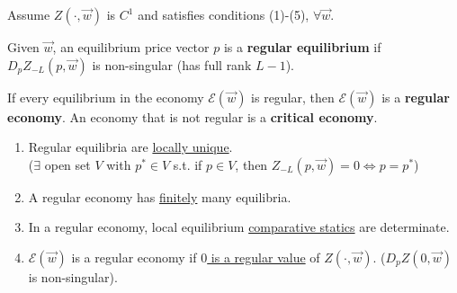 \documentclass[11pt]{elegantbook}
\begin{document}
Assume $Z(\cdot,\vec{w})$ is $C^1$ and satisfies conditions (1)-(5), $ \forall \vec{w}$.

\begin{definition}
    \normalfont
    Given $\vec{w}$, an equilibrium price vector $p$ is a \textbf{regular equilibrium} if $D_p Z_{-L}(p,\vec{w})$ is non-singular (has full rank $L-1$).
\end{definition}

\begin{definition}
    \normalfont
    If every equilibrium in the economy $\mathcal{E}(\vec{w})$ is regular, then $\mathcal{E}(\vec{w})$ is a \textbf{regular economy}. An economy that is not regular is a \textbf{critical economy}.
\end{definition}


\begin{proposition}
    \begin{enumerate}
        \item Regular equilibria are \underline{locally unique}.\\ ($\exists$ open set $V$ with $p^*\in V$ s.t. if $p\in V$, then $Z_{-L}(p,\vec{w})=0 \Leftrightarrow p=p^*$)
        \item A regular economy has \underline{finitely} many equilibria.
        \item In a regular economy, local equilibrium \underline{comparative statics} are determinate.
        \item $\mathcal{E}(\vec{w})$ is a regular economy if \underline{$0$ is a regular value} of $Z(\cdot,\vec{w})$. ($D_p Z(0,\vec{w})$ is non-singular).
    \end{enumerate}
\end{proposition}
\end{document}
